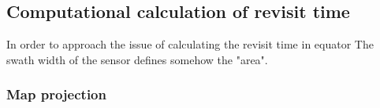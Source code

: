 
\subsection{Computational calculation of revisit time}

In order to approach the issue of calculating the revisit time in equator The swath width of the sensor defines somehow the "area". 

\subsubsection{Map projection}










